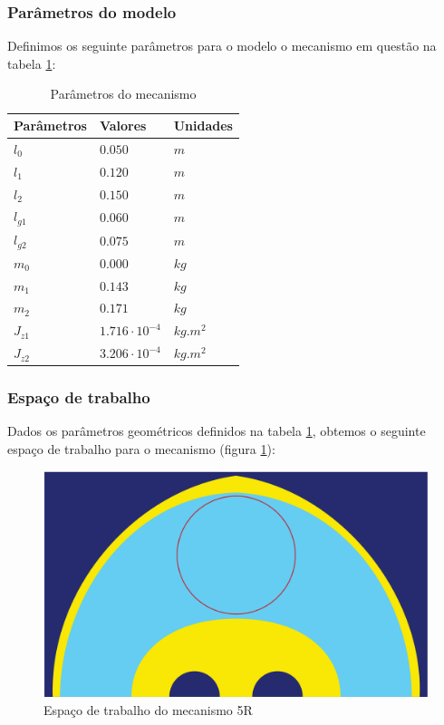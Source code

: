 \documentclass[]{politex}
\begin{document}
\subsubsection{Parâmetros do modelo}

Definimos os seguinte parâmetros para o modelo o mecanismo em questão na tabela \ref{tab:parametrosSimulacao}:

\begin{table}[H] 
\centering
\caption{Parâmetros do mecanismo}
\label{tab:parametrosSimulacao}
\begin{tabular}{l|l|l}
Parâmetros   & Valores                  & Unidades      \\ \hline
$l_0$        & $0.050$                     & $m$        \\
$l_1$        & $0.120$                     & $m$        \\
$l_2$        & $0.150$                     & $m$        \\
$l_{g1}$     & $0.060$                     & $m$        \\
$l_{g2}$     & $0.075$                    & $m$        \\
$m_0$        & $0.000$                    & $kg$       \\
$m_1$        & $0.143$                    & $kg$       \\
$m_2$        & $0.171$                    & $kg$       \\
$J_{z1}$     & $1.716 \cdot 10^{-4}$    & $kg.m^{2}$ \\
$J_{z2}$     & $3.206 \cdot 10^{-4}$    & $kg.m^{2}$ \\
\end{tabular}
\end{table}

\subsubsection{Espaço de trabalho}

Dados os parâmetros geométricos definidos na tabela \ref{tab:parametrosSimulacao}, obtemos o seguinte espaço de trabalho para o mecanismo (figura \ref{fig:RRWS}):

\begin{figure}[h]
	\centering
	\includegraphics[scale=0.25]{../figures/Workspace.pdf}  
	\caption{Espaço de trabalho do mecanismo 5R}
	\label{fig:RRWS}
\end{figure}
\end{document}
